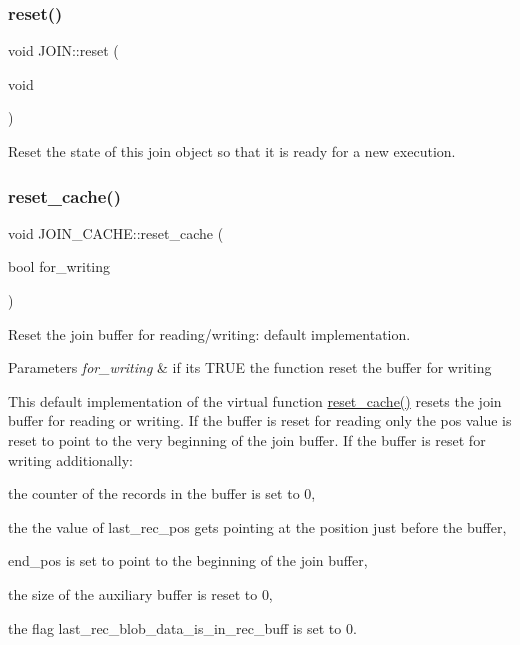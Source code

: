 \subsubsection{\texorpdfstring{reset()}{reset()}}
{\footnotesize\ttfamily void J\+O\+I\+N\+::reset (\begin{DoxyParamCaption}\item[{void}]{ }\end{DoxyParamCaption})}

Reset the state of this join object so that it is ready for a new execution. \mbox{\label{group__Query__Optimizer_gad54e309ac7f0fd377d7a422ea54f59f8}} 
\subsubsection{\texorpdfstring{reset\+\_\+cache()}{reset\_cache()}\hspace{0.1cm}{\footnotesize\ttfamily [1/2]}}
{\footnotesize\ttfamily void J\+O\+I\+N\+\_\+\+C\+A\+C\+H\+E\+::reset\+\_\+cache (\begin{DoxyParamCaption}\item[{bool}]{for\+\_\+writing }\end{DoxyParamCaption})\hspace{0.3cm}{\ttfamily [virtual]}}



Reset the join buffer for reading/writing\+: default implementation. 


\begin{DoxyParams}{Parameters}
{\em for\+\_\+writing} & if it\textquotesingle{}s T\+R\+UE the function reset the buffer for writing\\
\hline
\end{DoxyParams}
This default implementation of the virtual function \mbox{\hyperlink{group__Query__Optimizer_gad54e309ac7f0fd377d7a422ea54f59f8}{reset\+\_\+cache()}} resets the join buffer for reading or writing. If the buffer is reset for reading only the \textquotesingle{}pos\textquotesingle{} value is reset to point to the very beginning of the join buffer. If the buffer is reset for writing additionally\+:
\begin{DoxyItemize}
\item the counter of the records in the buffer is set to 0,
\item the the value of \textquotesingle{}last\+\_\+rec\+\_\+pos\textquotesingle{} gets pointing at the position just before the buffer,
\item \textquotesingle{}end\+\_\+pos\textquotesingle{} is set to point to the beginning of the join buffer,
\item the size of the auxiliary buffer is reset to 0,
\item the flag \textquotesingle{}last\+\_\+rec\+\_\+blob\+\_\+data\+\_\+is\+\_\+in\+\_\+rec\+\_\+buff\textquotesingle{} is set to 0. 
\end{DoxyItemize}

